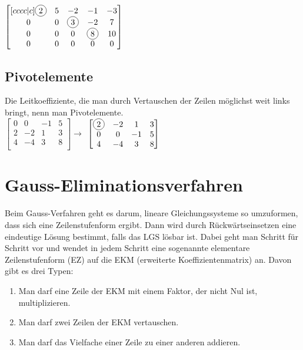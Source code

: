 \documentclass[../main.tex]{subfiles}
\begin{document}
$\begin{bmatrix}[cccc|c]
    \circled{2} & 5 & -2 & -1 & -3 \\
    0 & 0 & \circled{3} & -2 &  7 \\
    0 & 0 & 0 & \circled{8} &  10 \\
    0 & 0 & 0 & 0 & 0 \\
\end{bmatrix}$

\subsection{Pivotelemente}
Die Leitkoeffiziente, die man durch Vertauschen der Zeilen möglichst weit links bringt,
nenn man Pivotelemente. \\

$\begin{bmatrix}
    0 & 0 & -1 & 5  \\
    2 & -2 & 1 & 3 \\
    4 & -4 & 3 & 8 \\
\end{bmatrix} \rightarrow$
$\begin{bmatrix}
    \circled{2} & -2 & 1 & 3 \\
    0 & 0 & -1 & 5  \\
    4 & -4 & 3 & 8 \\
\end{bmatrix}$

\section{Gauss-Eliminationsverfahren}
Beim Gauss-Verfahren geht es darum, lineare Gleichungssysteme so umzuformen, dass sich eine
Zeilenstufenform ergibt. Dann wird durch Rückwärtseinsetzen eine eindeutige Lösung bestimmt,
falls das LGS lösbar ist. Dabei geht man Schritt für Schritt vor und wendet in jedem Schritt
eine sogenannte elementare Zeilenstufenform (EZ) auf die EKM (erweiterte Koeffizientenmatrix) an. Davon gibt es drei Typen: \\

\begin{enumerate}
    \item Man darf eine Zeile der EKM  mit einem Faktor, der nicht Nul ist, multiplizieren.
    \item Man darf zwei Zeilen der EKM vertauschen.
    \item Man darf das Vielfache einer Zeile zu einer anderen addieren.
\end{enumerate}
\end{document}
